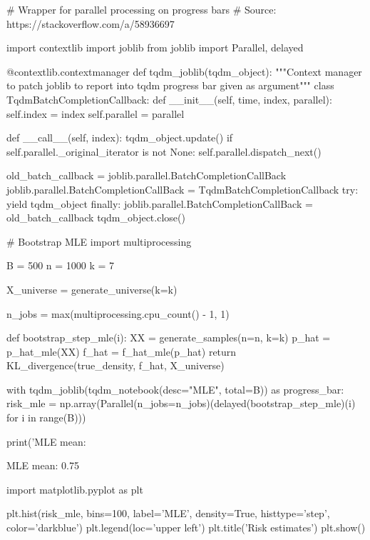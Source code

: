\begin{python}
# Wrapper for parallel processing on progress bars
# Source: https://stackoverflow.com/a/58936697

import contextlib
import joblib
from joblib import Parallel, delayed

@contextlib.contextmanager
def tqdm_{j}oblib(tqdm_object):
    """Context manager to patch joblib to report into tqdm progress bar given as argument"""
    class TqdmBatchCompletionCallback:
        def __{i}nit__(self, time, index, parallel):
            self.index = index
            self.parallel = parallel

        def __call__(self, index):
            tqdm_object.update()
            if self.parallel._original_{i}terator is not None:
                self.parallel.dispatch_{n}ext()

    old_batch_callback = joblib.parallel.BatchCompletionCallBack
    joblib.parallel.BatchCompletionCallBack = TqdmBatchCompletionCallback
    try:
        yield tqdm_object
    finally:
        joblib.parallel.BatchCompletionCallBack = old_batch_callback
        tqdm_object.close()  
\end{python}

\begin{python}
# Bootstrap MLE
import multiprocessing

B = 500
n = 1000
k = 7

X_universe = generate_universe(k=k)

n_{j}obs = max(multiprocessing.cpu_count() - 1, 1)

def bootstrap_step_mle(i):
    XX = generate_samples(n=n, k=k)
    p_hat = p_hat_mle(XX)
    f_hat = f_hat_mle(p_hat)
    return KL_divergence(true_density, f_hat, X_universe)

with tqdm_{j}oblib(tqdm_{n}otebook(desc="MLE", total=B)) as progress_bar:
    risk_mle = np.array(Parallel(n_{j}obs=n_{j}obs)(delayed(bootstrap_step_mle)(i) for i in range(B)))

print('MLE mean: %
\end{python}

\begin{console}
MLE mean: 0.75
\end{console}

\begin{python}
import matplotlib.pyplot as plt

plt.hist(risk_mle, bins=100, label='MLE', density=True, histtype='step', color='darkblue')
plt.legend(loc='upper left')
plt.title('Risk estimates')
plt.show()
\end{python}

